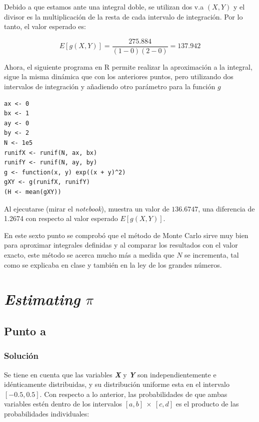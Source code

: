 \documentclass[12pt]{article}
\begin{document}
Debido a que estamos ante una integral doble, se utilizan dos v.a $(X, Y)$ y el divisor es la multiplicación de la resta de cada intervalo de integración. Por lo tanto, el valor esperado es:

\[
E[g(X, Y)] = \frac{275.884}{(1 - 0) (2 - 0)} = 137.942
\]

Ahora, el siguiente programa en \textsf{R} permite realizar la aproximación a la integral, sigue la misma dinámica que con los anteriores puntos, pero utilizando dos intervalos de integración y añadiendo otro parámetro para la función $g$

\begin{lstlisting}
ax <- 0
bx <- 1
ay <- 0
by <- 2
N <- 1e5
runifX <- runif(N, ax, bx)
runifY <- runif(N, ay, by)
g <- function(x, y) exp((x + y)^2)
gXY <- g(runifX, runifY)
(H <- mean(gXY))
\end{lstlisting}

Al ejecutarse (mirar el \textit{notebook}), muestra un valor de $136.6747$, una diferencia de 1.2674 con respecto al valor esperado $E[g(X, Y)]$.

En este sexto punto se comprobó que el método de Monte Carlo sirve muy bien para aproximar integrales definidas y al comparar los resultados con el valor exacto, este método se acerca mucho más a medida que $N$ se incrementa, tal como se explicaba en clase y también en la ley de los grandes números.





\section{\textit{Estimating} \(\pi\)}

\subsection{Punto a}
\subsubsection{Solución}

Se tiene en cuenta que las variables \textit{\textbf{X}} y \textit{\textbf{Y}} son independientemente e idénticamente distribuidas, y su distribución uniforme esta en el intervalo $[-0.5, 0.5]$. Con respecto a lo anterior, las probabilidades de que ambas variables estén dentro de los intervalos $[a,b]\ \times\ [c,d]$ es el producto de las probabilidades individuales:
\end{document}
